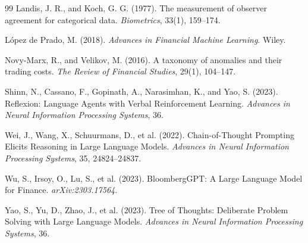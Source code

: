 \documentclass[11pt,a4paper]{article}
\begin{document}
\begin{thebibliography}{99}
Landis, J. R., and Koch, G. G. (1977). The measurement of observer agreement for categorical
data. \emph{Biometrics}, 33(1), 159--174.

L\'opez de Prado, M. (2018). \emph{Advances in Financial Machine Learning}. Wiley.

Novy-Marx, R., and Velikov, M. (2016). A taxonomy of anomalies and their trading costs.
\emph{The Review of Financial Studies}, 29(1), 104--147.

Shinn, N., Cassano, F., Gopinath, A., Narasimhan, K., and Yao, S. (2023).
Reflexion: Language Agents with Verbal Reinforcement Learning.
\emph{Advances in Neural Information Processing Systems}, 36.

Wei, J., Wang, X., Schuurmans, D., et al. (2022).
Chain-of-Thought Prompting Elicits Reasoning in Large Language Models.
\emph{Advances in Neural Information Processing Systems}, 35, 24824--24837.

Wu, S., Irsoy, O., Lu, S., et al. (2023).
BloombergGPT: A Large Language Model for Finance. \emph{arXiv:2303.17564}.

Yao, S., Yu, D., Zhao, J., et al. (2023).
Tree of Thoughts: Deliberate Problem Solving with Large Language Models.
\emph{Advances in Neural Information Processing Systems}, 36.

\end{thebibliography}
\end{document}
